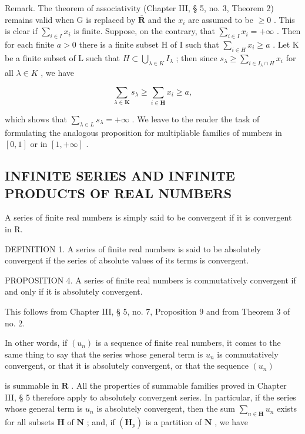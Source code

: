 Remark. The theorem of associativity (Chapter III, § 5, no. 3, Theorem 2) remains valid when G is replaced by \(\overline{\mathbf{R}}\) and the \(x_{i}\) are assumed to be \(\geqslant 0\) . This is clear if \(\sum_{i \in I} x_{i}\) is finite. Suppose, on the contrary, that \(\sum_{i \in I} x_{i} = +\infty\) . Then for each finite \(a > 0\) there is a finite subset H of I such that \(\sum_{i \in H} x_{i} \geqslant a\) . Let K be a finite subset of L such that \(H \subset \bigcup_{\lambda \in K} I_{\lambda}\) ; then since \(s_{\lambda} \geqslant \sum_{i \in I_{\lambda} \cap H} x_{i}\) for all \(\lambda \in K\) , we have

\[
\sum_ {\lambda \in \mathbf {K}} s _ {\lambda} \geqslant \sum_ {i \in \mathbf {H}} x _ {i} \geqslant a,
\]

which shows that \(\sum_{\lambda \in L} s_{\lambda} = +\infty\) . We leave to the reader the task of formulating the analogous proposition for multipliable families of numbers in \([0, 1]\) or in \([1, +\infty]\) .

\subsection{INFINITE SERIES AND INFINITE PRODUCTS OF REAL NUMBERS}

A series of finite real numbers is simply said to be convergent if it is convergent in R.

DEFINITION 1. A series of finite real numbers is said to be absolutely convergent if the series of absolute values of its terms is convergent.

PROPOSITION 4. A series of finite real numbers is commutatively convergent if and only if it is absolutely convergent.

This follows from Chapter III, § 5, no. 7, Proposition 9 and from Theorem 3 of no. 2.

In other words, if \((u_{n})\) is a sequence of finite real numbers, it comes to the same thing to say that the series whose general term is \(u_{n}\) is commutatively convergent, or that it is absolutely convergent, or that the sequence \((u_{n})\)

is summable in \(\mathbf{R}\) . All the properties of summable families proved in Chapter III, § 5 therefore apply to absolutely convergent series. In particular, if the series whose general term is \(u_{n}\) is absolutely convergent, then the sum \(\sum_{n\in\mathbf{H}} u_{n}\) exists for all subsets \(\mathbf{H}\) of \(\mathbf{N}\) ; and, if \((\mathbf{H}_{p})\) is a partition of \(\mathbf{N}\) , we have

